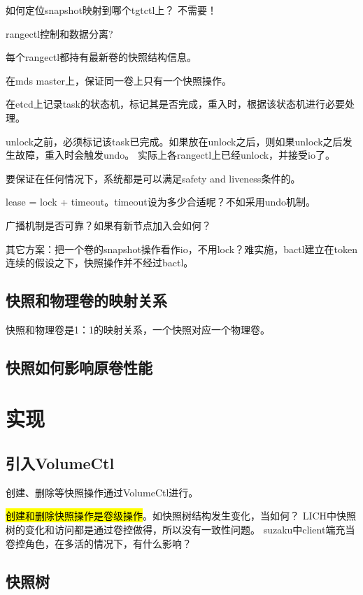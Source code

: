 如何定位snapshot映射到哪个tgtctl上？ 不需要！

rangectl控制和数据分离?

每个rangectl都持有最新卷的快照结构信息。

在mds master上，保证同一卷上只有一个快照操作。

在etcd上记录task的状态机，标记其是否完成，重入时，根据该状态机进行必要处理。

unlock之前，必须标记该task已完成。如果放在unlock之后，则如果unlock之后发生故障，重入时会触发undo。
实际上各rangectl上已经unlock，并接受io了。

要保证在任何情况下，系统都是可以满足safety and liveness条件的。

lease = lock + timeout。timeout设为多少合适呢？不如采用undo机制。

广播机制是否可靠？如果有新节点加入会如何？

其它方案：把一个卷的snapshot操作看作io，不用lock？难实施，bactl建立在token连续的假设之下，快照操作并不经过bactl。

\subsection{快照和物理卷的映射关系}

快照和物理卷是1：1的映射关系，一个快照对应一个物理卷。

\subsection{快照如何影响原卷性能}

\section{实现}

\subsection{引入VolumeCtl}

创建、删除等快照操作通过VolumeCtl进行。

\hl{创建和删除快照操作是卷级操作}。如快照树结构发生变化，当如何？
LICH中快照树的变化和访问都是通过卷控做得，所以没有一致性问题。
suzaku中client端充当卷控角色，在多活的情况下，有什么影响？


\subsection{快照树}

